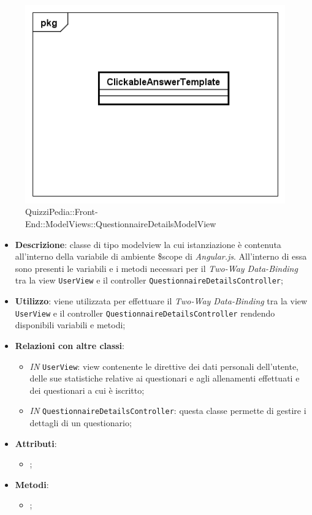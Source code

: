 	\begin{figure}[ht]
		\centering
		\includegraphics[scale=0.5,keepaspectratio]{UML/Classi/Front-End/QuizziPedia_Front-end_Templates_ClickableAnswerTemplate.png}
		\caption{QuizziPedia::Front-End::ModelViews::QuestionnaireDetailsModelView}
	\end{figure} \FloatBarrier
	
	\begin{itemize}
		\item \textbf{Descrizione}: classe di tipo modelview la cui istanziazione è contenuta all'interno della variabile di ambiente \$scope di \textit{Angular.js}. All'interno di essa sono presenti le variabili e i metodi necessari per il \textit{Two-Way Data-Binding} tra la view \texttt{UserView} e il controller \texttt{QuestionnaireDetailsController};
		\item \textbf{Utilizzo}: viene utilizzata per effettuare il \textit{Two-Way Data-Binding} tra la view \texttt{UserView} e il controller \texttt{QuestionnaireDetailsController} rendendo disponibili variabili e metodi;
		\item \textbf{Relazioni con altre classi}: 
		\begin{itemize}
			\item \textit{IN} \texttt{UserView}: view contenente le direttive dei dati personali dell'utente, delle sue statistiche relative ai questionari e agli allenamenti effettuati e dei questionari a cui è iscritto; 
			\item \textit{IN} \texttt{QuestionnaireDetailsController}: questa classe permette di gestire i dettagli di un questionario;
		\end{itemize}
		\item \textbf{Attributi}: 
		\begin{itemize}
			\item ;
		\end{itemize}
		\item \textbf{Metodi}: 
		\begin{itemize}
			\item ;
		\end{itemize}
	\end{itemize}
	
